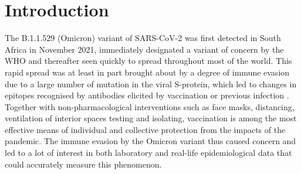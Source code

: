 \documentclass[preprint,12pt,authoryear]{elsarticle}
\begin{document}

\section{Introduction}
\label{sec1}

The B.1.1.529 (Omicron) variant of SARS-CoV-2 was first detected in South Africa in November 2021, immediately designated a variant of concern by the WHO \citep{who2021omicron} and  thereafter seen quickly to spread throughout most of the world. This rapid spread was at least in part brought about by a degree of immune evasion due to a large number of mutation in the viral S-protein, which led to changes in epitopes recognised by antibodies elicited by vaccination or previous infection \citep{mccallum2022}. Together with non-pharmacological interventions such as face masks, distancing, ventilation of interior spaces testing and isolating, vaccination is among the most effective means of individual and collective protection from the impacts of the pandemic. The immune evasion by the Omicron variant thus caused concern and led to a lot of interest in both laboratory and real-life epidemiological data that could accurately measure this phenomenon.


\end{document}
